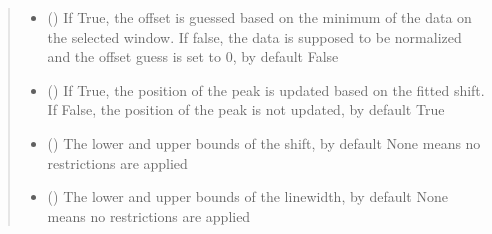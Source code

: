 \documentclass[letterpaper,10pt,english]{sphinxmanual}
\begin{document}
\begin{fulllineitems}
\begin{fulllineitems}
\begin{quote}
\begin{description}
\begin{itemize}
\item {} 
\sphinxAtStartPar
{} (\sphinxstyleliteralemphasis{\sphinxupquote{, }}) \textendash{} If True, the offset is guessed based on the minimum of the data on the selected window. If false, the data is supposed to be normalized and the offset guess is set to 0, by default False

\item {} 
\sphinxAtStartPar
{} (\sphinxstyleliteralemphasis{\sphinxupquote{, }}) \textendash{} If True, the position of the peak is updated based on the fitted shift. If False, the position of the peak is not updated, by default True

\item {} 
\sphinxAtStartPar
{} (\sphinxstyleliteralemphasis{\sphinxupquote{, }}) \textendash{} The lower and upper bounds of the shift, by default None means no restrictions are applied

\item {} 
\sphinxAtStartPar
{} (\sphinxstyleliteralemphasis{\sphinxupquote{, }}) \textendash{} The lower and upper bounds of the linewidth, by default None means no restrictions are applied

\end{itemize}

\end{description}\end{quote}

\end{fulllineitems}



\end{fulllineitems}
\end{document}

